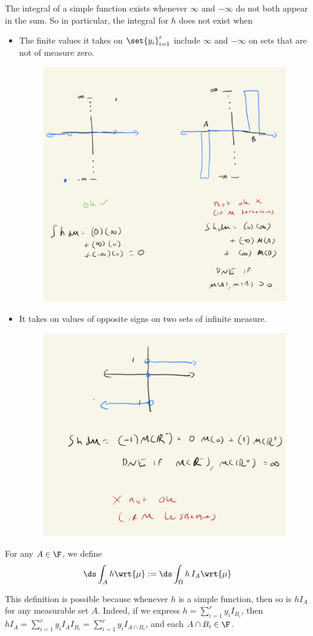 \documentclass{article} %
\begin{document}
\begin{remark}{}
The integral of a simple function exists whenever $\infty$ and  $-\infty$ do not both appear in the sum.  So in particular, the integral for $h$ does not exist when
\begin{itemize}
\item The finite values it takes on $\set{y_i}_{i=1}^r$ include 	$\infty$ and $-\infty$ on sets that are not of measure zero.
\begin{figure}[H]
\centering
\includegraphics[width=.5\textwidth]{images/when_does_integral_of_simple_function_exist_part_1}
\end{figure}

\item It takes on values of opposite signs on two sets of infinite measure.
\begin{figure}[H]
\centering
\includegraphics[width=.5\textwidth]{images/when_does_integral_of_simple_function_exist_part_2}
\end{figure}
\end{itemize}
 
\label{rk:when_does_integral_of_simple_function_exist}
\end{remark}

\begin{remark}{}
For any $A \in \F$, we define 
\[ \ds\int_A h \wrt{\mu} := \ds\int_\Omega h \, I_A \wrt{\mu}  \]

This definition is possible because whenever $h$ is a simple function, then so is $h I_A$ for any measurable set $A$.   Indeed, if we express $h = \sum_{i=1}^r y_i I_{B_i}$, then $h I_A = \sum_{i=1}^r y_i I_{A} I_{B_i} = \sum_{i=1}^r y_i I_{A \cap B_i}$, and each $A \cap B_i \in \F$.  
\label{rk:integrating_simple_functions_over_arbitrary_measurable_subsets}
 \end{remark}
 
\end{document}
